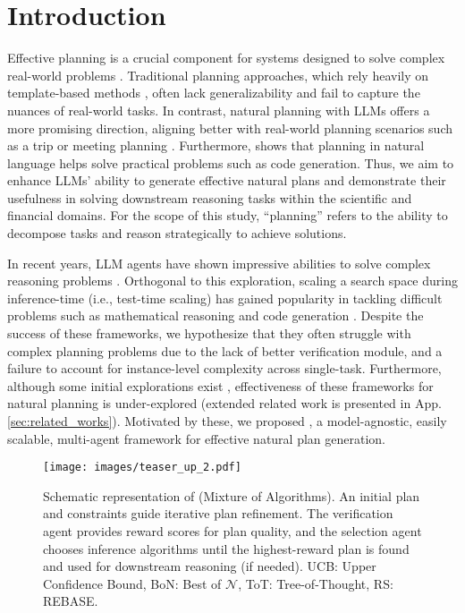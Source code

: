 \section{Introduction}
\label{sec:introduction}

Effective planning is a crucial component for systems designed to solve complex real-world problems \citep{hao-etal-2023-reasoning, zhao-etal-2023-explicit, wang2024sibyl, jiao-etal-2024-learning, wang2025planning}. Traditional planning approaches, which rely heavily on template-based methods \citep{guan2023leveraging, valmeekam2024planbench, wang2024promptagent}, often lack generalizability and fail to capture the nuances of real-world tasks. In contrast, natural planning with LLMs offers a more promising direction, aligning better with real-world planning scenarios such as a trip or meeting planning \citep{zheng2024natural}. Furthermore, \citet{wang2025planning} shows that planning in natural language helps solve practical problems such as code generation. Thus, we aim to enhance LLMs' ability to generate effective natural plans and demonstrate their usefulness in solving downstream reasoning tasks within the scientific and financial domains. For the scope of this study, ``planning'' refers to the ability to decompose tasks and reason strategically to achieve solutions.

In recent years, LLM agents have shown impressive abilities to solve complex reasoning problems \citep{yao2023react, xiao2024chainofexperts, wang2024survey}. Orthogonal to this exploration, scaling a search space during inference-time (i.e., test-time scaling) \citep{snell2024scaling, welleck2024decoding} has gained popularity in tackling difficult problems such as mathematical reasoning \citep{zhang2024accessing} and code generation \citep{wang2025planning}. Despite the success of these frameworks, we hypothesize that they often struggle with complex planning problems due to the lack of better verification module, and a failure to account for instance-level complexity across single-task. Furthermore, although some initial explorations exist \citep{bohnet2024exploring, lee2025evolving}, effectiveness of these frameworks for natural planning is under-explored (extended related work is presented in App. \ref{sec:related_works}). Motivated by these, we proposed \plangen{}, a model-agnostic, easily scalable, multi-agent framework for effective natural plan generation. 

\begin{figure*}
    \centering
    \texttt{[image: images/teaser\_up\_2.pdf]}
    \caption{Schematic representation of \plangen{} (Mixture of Algorithms). An initial plan and constraints guide iterative plan refinement. The verification agent provides reward scores for plan quality, and the selection agent chooses inference algorithms until the highest-reward plan is found and used for downstream reasoning (if needed). UCB: Upper Confidence Bound, BoN: Best of $\mathcal{N}$, ToT: Tree-of-Thought, RS: REBASE.}
    \label{fig:teaser}
\end{figure*}

